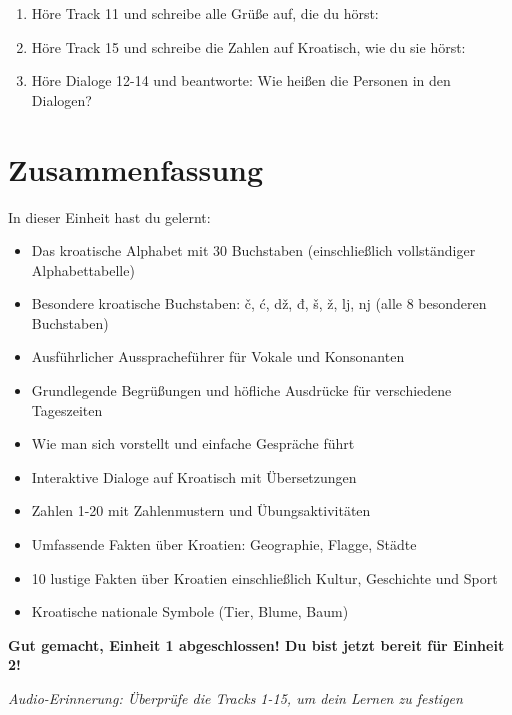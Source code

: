 \begin{exercise}
\begin{enumerate}
    \item Höre Track 11 und schreibe alle Grüße auf, die du hörst:
    
    \vspace{2cm}
    
    \item Höre Track 15 und schreibe die Zahlen auf Kroatisch, wie du sie hörst:
    
    \vspace{2cm}
    
    \item Höre Dialoge 12-14 und beantworte: Wie heißen die Personen in den Dialogen?
    
    \vspace{2cm}
\end{enumerate}
\end{exercise}

\section{Zusammenfassung}

In dieser Einheit hast du gelernt:
\begin{itemize}
    \item Das kroatische Alphabet mit 30 Buchstaben (einschließlich vollständiger Alphabettabelle)
    \item Besondere kroatische Buchstaben: č, ć, dž, đ, š, ž, lj, nj (alle 8 besonderen Buchstaben)
    \item Ausführlicher Ausspracheführer für Vokale und Konsonanten
    \item Grundlegende Begrüßungen und höfliche Ausdrücke für verschiedene Tageszeiten
    \item Wie man sich vorstellt und einfache Gespräche führt
    \item Interaktive Dialoge auf Kroatisch mit Übersetzungen
    \item Zahlen 1-20 mit Zahlenmustern und Übungsaktivitäten
    \item Umfassende Fakten über Kroatien: Geographie, Flagge, Städte
    \item 10 lustige Fakten über Kroatien einschließlich Kultur, Geschichte und Sport
    \item Kroatische nationale Symbole (Tier, Blume, Baum)
\end{itemize}

\vspace{1cm}

\textbf{Gut gemacht, Einheit 1 abgeschlossen! Du bist jetzt bereit für Einheit 2!}

\textit{Audio-Erinnerung: Überprüfe die Tracks 1-15, um dein Lernen zu festigen}
